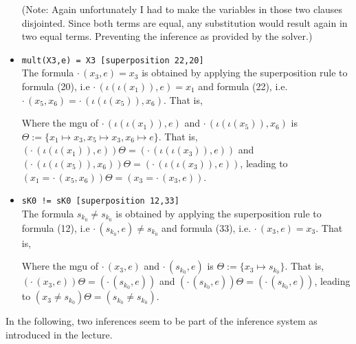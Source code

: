 \documentclass[11pt,a4paper]{article}
\begin{document}
\begin{itemize}
(Note: Again unfortunately I had to make the variables in those two clauses disjointed. Since both terms are equal, any substitution would result again in two equal terms. Preventing the inference as provided by the solver.)


\item \texttt{mult(X3,e) = X3 [superposition 22,20]}\\
The formula $\cdot \,(x_3,e) =x_3$ is obtained by applying the superposition rule to formula (20), i.e $\cdot \,(\iota(\iota(x_1)),e)=x_1$ and formula (22), i.e. $\cdot \,(x_5, x_6) = \cdot \, (\iota(\iota(x_5)),x_6)$. That is, 
\begin{prooftree}
\end{prooftree}
Where the mgu of $\cdot \,(\iota(\iota(x_1)),e)$ and $\cdot \, (\iota(\iota(x_5)),x_6)$ is $\Theta := \{x_1 \mapsto x_3 , x_5 \mapsto x_3, x_6 \mapsto e\}$. That is, $(\cdot \,(\iota(\iota(x_1)),e))\Theta = (\cdot \,(\iota(\iota(x_3)),e))$ and $(\cdot \, (\iota(\iota(x_5)),x_6))\Theta = (\cdot \, (\iota(\iota(x_3)),e))$, leading to $(x_1 = \cdot \,(x_5,x_6)) \Theta = (x_3 = \cdot \,(x_3,e))$.

\item \texttt{sK0 != sK0 [superposition 12,33]}\\
The formula $s_{k_0} \neq s_{k_0}$ is obtained by applying the superposition rule to formula (12), i.e $\cdot \, (s_{k_0}, e) \neq s_{k_0}$ and formula (33), i.e. $\cdot \,(x_3,e) =x_3$. That is, 
\begin{prooftree}
\end{prooftree}
Where the mgu of $\cdot \,(x_3,e) $ and $\cdot \, (s_{k_0}, e)$ is $\Theta := \{x_3 \mapsto s_{k_0}\}$. That is, $(\cdot \,(x_3,e))\Theta = (\cdot \, (s_{k_0}, e) )$ and $(\cdot \, (s_{k_0}, e) )\Theta = (\cdot \, (s_{k_0}, e) )$, leading to $(x_3  \neq s_{k_0} ) \Theta = (s_{k_0} \neq s_{k_0})$.
\end{itemize}


In the following, two inferences  seem to be part of the inference system as introduced in the lecture. 
\end{document}
